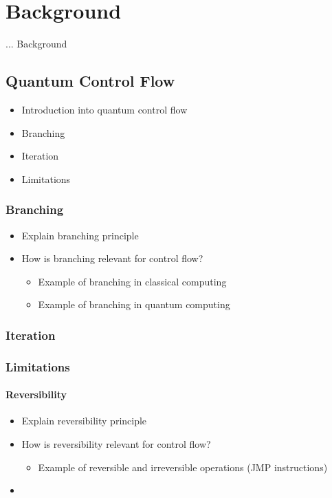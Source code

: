 \chapter{Background}
... Background



\section{Quantum Control Flow}
\begin{itemize}
    \item Introduction into quantum control flow
    \item Branching
    \item Iteration
    \item Limitations
\end{itemize}

\subsection{Branching}
\begin{itemize}
    \item Explain branching principle
    \item How is branching relevant for control flow?
    \begin{itemize}
        \item Example of branching in classical computing
        \item Example of branching in quantum computing
    \end{itemize}
\end{itemize}

\subsection{Iteration}

\subsection{Limitations}	

\subsubsection{Reversibility}
\begin{itemize}
    \item Explain reversibility principle
    \item How is reversibility relevant for control flow?
    \begin{itemize}
        \item Example of reversible and irreversible operations (JMP instructions)
    \end{itemize} 
    \item 
\end{itemize}

